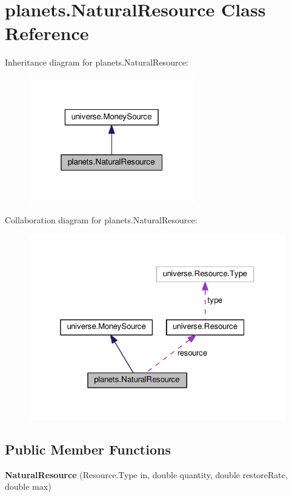 \hypertarget{classplanets_1_1_natural_resource}{}\section{planets.\+Natural\+Resource Class Reference}
\label{classplanets_1_1_natural_resource}


Inheritance diagram for planets.\+Natural\+Resource\+:\nopagebreak
\begin{figure}[H]
\begin{center}
\leavevmode
\includegraphics[width=205pt]{classplanets_1_1_natural_resource__inherit__graph}
\end{center}
\end{figure}


Collaboration diagram for planets.\+Natural\+Resource\+:\nopagebreak
\begin{figure}[H]
\begin{center}
\leavevmode
\includegraphics[width=325pt]{classplanets_1_1_natural_resource__coll__graph}
\end{center}
\end{figure}
\subsection*{Public Member Functions}
\begin{DoxyCompactItemize}
\item 
{\bfseries Natural\+Resource} (Resource.\+Type in, double quantity, double restore\+Rate, double max)\hypertarget{classplanets_1_1_natural_resource_a3f355c0819343848fac8e1abd6da00a2}{}\label{classplanets_1_1_natural_resource_a3f355c0819343848fac8e1abd6da00a2}

\end{DoxyCompactItemize}
